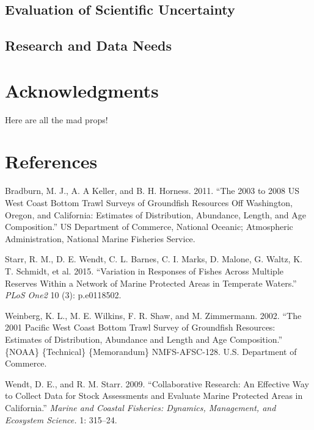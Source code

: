 \documentclass[11pt,
  english,
  letterpaper,
]{article}
\newlength{\cslhangindent}
\newenvironment{CSLReferences}[2] %
 {%
  \setlength{\parindent}{0pt}
  \ifodd #1 \everypar{\setlength{\hangindent}{\cslhangindent}}\ignorespaces\fi
  \ifnum #2 > 0
  \setlength{\parskip}{#2\baselineskip}
  \fi
 }%
 {}
\begin{document}
\hypertarget{evaluation-of-scientific-uncertainty}{%
\subsection{Evaluation of Scientific Uncertainty}\label{evaluation-of-scientific-uncertainty}}

\hypertarget{research-and-data-needs-1}{%
\subsection{Research and Data Needs}\label{research-and-data-needs-1}}

\hypertarget{acknowledgments}{%
\section{Acknowledgments}\label{acknowledgments}}

Here are all the mad props!

\clearpage

\hypertarget{references}{%
\section{References}\label{references}}

\hypertarget{refs}{}
\begin{CSLReferences}{1}{0}
\leavevmode{}%
Bradburn, M. J., A. A Keller, and B. H. Horness. 2011. {``The 2003 to 2008 {US} {West} {Coast} Bottom Trawl Surveys of Groundfish Resources Off {Washington}, {Oregon}, and {California}: Estimates of Distribution, Abundance, Length, and Age Composition.''} US Department of Commerce, National Oceanic; Atmospheric Administration, National Marine Fisheries Service.

\leavevmode{}%
Starr, R. M., D. E. Wendt, C. L. Barnes, C. I. Marks, D. Malone, G. Waltz, K. T. Schmidt, et al. 2015. {``Variation in Responses of Fishes Across Multiple Reserves Within a Network of Marine Protected Areas in Temperate Waters.''} \emph{PLoS One2} 10 (3): p.e0118502.

\leavevmode{}%
Weinberg, K. L., M. E. Wilkins, F. R. Shaw, and M. Zimmermann. 2002. {``The 2001 {Pacific} {West} {Coast} Bottom Trawl Survey of Groundfish Resources: Estimates of Distribution, Abundance and Length and Age Composition.''} \{NOAA\} \{Technical\} \{Memorandum\} NMFS-AFSC-128. U.S. Department of Commerce.

\leavevmode{}%
Wendt, D. E., and R. M. Starr. 2009. {``Collaborative Research: An Effective Way to Collect Data for Stock Assessments and Evaluate Marine Protected Areas in {C}alifornia.''} \emph{Marine and Coastal Fisheries: Dynamics, Management, and Ecosystem Science.} 1: 315--24.

\end{CSLReferences}
\end{document}
